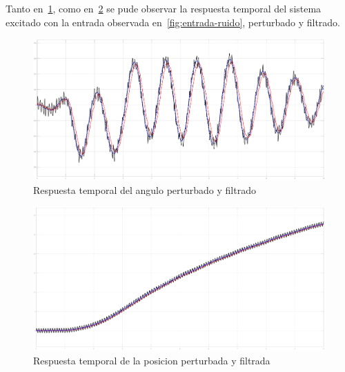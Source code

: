 Tanto en~\ref{fig:filtro-angle}, como en~\ref{fig:filtro-c} se pude observar la
respuesta temporal del sistema excitado con la entrada observada
en~\ref{fig:entrada-ruido}, perturbado y filtrado.

\begin{figure}[t]
  \label{fig:filtro-angle}
  \includegraphics[scale=0.15]{Figuras/filtro-angle}
  \caption{Respuesta temporal del angulo perturbado y filtrado} 
\end{figure}

\begin{figure}[t]
  \label{fig:filtro-c}
  \includegraphics[scale=0.15]{Figuras/filtro-c}
  \caption{Respuesta temporal de la posicion perturbada y filtrada} 
\end{figure}
